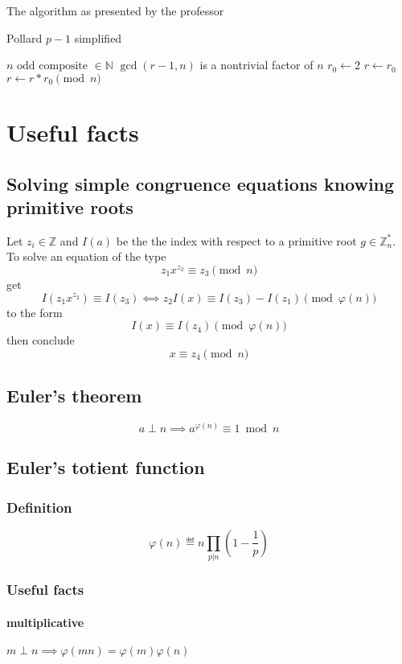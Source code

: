\documentclass{article}
\begin{document}
	The algorithm as presented by the professor

	\begin{algorithm}[H]
		\caption{Pollard $p-1$ simplified}\label{alg:pollar-p-1-simp}
		\begin{algorithmic}
			\REQUIRE $n \textrm{ odd composite } ∈ ℕ$
			\ENSURE $\gcd(r-1,n)$ is a nontrivial factor of $n$
			\STATE $r_0 \gets 2$
			\STATE $r \gets r_0$
			\STATE $r \gets r*r_0 \pmod n$
			\ENDWHILE
		\end{algorithmic}
	\end{algorithm}

\section{Useful facts}

\subsection{Solving simple congruence equations knowing primitive roots}

Let $z_i ∈ ℤ$ and $I(a)$ be the the index with respect to a primitive root $g ∈ ℤ_n^*$.
To solve an equation of the type $$z_1x^{z_2} ≡ z_3 \pmod n$$
get $$I(z_1x^{z_2}) ≡ I(z_3) ⟺ z_2I(x) ≡ I(z_3) - I(z_1) \pmod {φ(n)}$$ to the form
$$I(x) ≡ I(z_4) \pmod {φ(n)}$$ then conclude $$x ≡ z_4 \pmod n$$

\subsection{Euler's theorem}
$$a ⟂ n ⟹ a^{φ(n)} ≡ 1 \bmod n$$

\subsection{Euler's totient function}

\subsubsection{Definition}
$$φ(n) ≝ n \displaystyle∏_{p|n} (1-\frac{1}{p})$$

\subsubsection{Useful facts}

\paragraph{multiplicative} $m ⟂ n ⟹ φ(mn) = φ(m)φ(n)$
\end{document}
